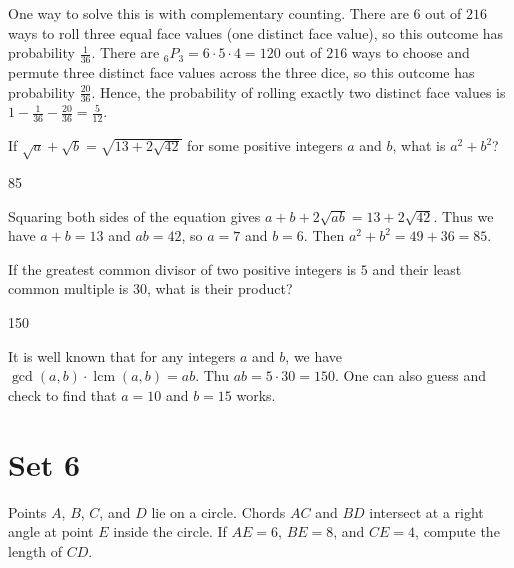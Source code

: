 \documentclass[11pt]{article}
\begin{document}
\begin{solution}
One way to solve this is with complementary counting. There are $6$ out of $216$ ways to roll three equal face values (one distinct face value), so this outcome has probability $\frac{1}{36}$. There are $_6P_3 = 6 \cdot 5 \cdot 4 = 120$ out of $216$ ways to choose and permute three distinct face values across the three dice, so this outcome has probability $\frac{20}{36}$. Hence, the probability of rolling exactly two distinct face values is $1 - \frac{1}{36} - \frac{20}{36} = \frac{5}{12}$.
\end{solution}


\begin{problem}%
If $\sqrt{a}+\sqrt{b} = \sqrt{13+2\sqrt{42}}$ for some positive integers $a$ and $b$, what is $a^2+b^2$?
\end{problem}

\begin{answer}
85
\end{answer}

\begin{solution}
Squaring both sides of the equation gives $a + b + 2\sqrt{ab} = 13 + 2\sqrt{42}$. Thus we have $a+b = 13$ and $ab = 42$, so $a = 7$ and $b = 6$. Then $a^2 + b^2 = 49 + 36 = 85$.
\end{solution}

\begin{problem}
If the greatest common divisor of two positive integers is $5$ and their least common multiple is $30$, what is their product?
\end{problem}

\begin{answer}
150
\end{answer}

\begin{solution}
It is well known that for any integers $a$ and $b$, we have $\gcd(a ,b) \cdot \operatorname{lcm}(a, b) = ab$. Thu $ab = 5 \cdot 30 = 150$. One can also guess and check to find that $a = 10$ and $b = 15$ works.
\end{solution}

\newpage

\section*{Set 6}

\begin{problem}
Points $A$, $B$, $C$, and $D$ lie on a circle. Chords $AC$ and $BD$ intersect at a right angle at point $E$ inside the circle. If $AE = 6$, $BE = 8$, and $CE = 4$, compute the length of $CD$.
\end{problem}
\end{document}
